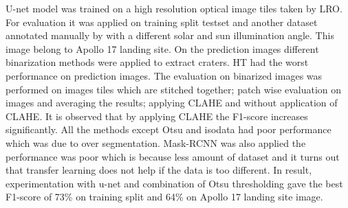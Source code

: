 \documentclass[11pt]{article}
\begin{document}
U-net model was trained on a high resolution optical image tiles taken by LRO. For evaluation it was applied on training split testset and another dataset annotated manually by \cite{dino2020} with a different solar and sun illumination angle. This image belong to Apollo 17 landing site. On the prediction images different binarization methods were applied to extract craters. HT had the worst performance on prediction images. The evaluation on binarized images was performed on images tiles which are stitched together; patch wise evaluation on images and averaging the results; applying CLAHE and without application of CLAHE. It is observed that by applying CLAHE the F1-score increases significantly. All the methods except Otsu and isodata had poor performance which was due to over segmentation. Mask-RCNN was also applied the performance was poor which is because less amount of dataset and it turns out that transfer learning does not help if the data is too different. In result, experimentation with u-net and combination of Otsu thresholding gave the best F1-score of 73\% on training split and 64\% on Apollo 17 landing site image.

\newpage
\clearpage




	


\end{document}
